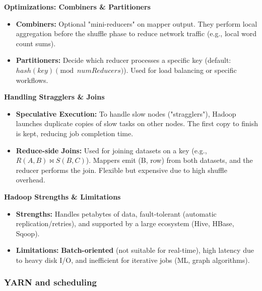 \textbf{Optimizations: Combiners \& Partitioners}
\begin{itemize}
    \item \textbf{Combiners:} Optional "mini-reducers" on mapper output. They perform local aggregation before the shuffle phase to reduce network traffic (e.g., local word count sums).
    \item \textbf{Partitioners:} Decide which reducer processes a specific key (default: $hash(key) \pmod{numReducers}$). Used for load balancing or specific workflows.
\end{itemize}



\textbf{Handling Stragglers \& Joins}
\begin{itemize}
    \item \textbf{Speculative Execution:} To handle slow nodes ("stragglers"), Hadoop launches duplicate copies of slow tasks on other nodes. The first copy to finish is kept, reducing job completion time.
    \item \textbf{Reduce-side Joins:} Used for joining datasets on a key (e.g., $R(A,B) \bowtie S(B,C)$). Mappers emit (B, row) from both datasets, and the reducer performs the join. Flexible but expensive due to high shuffle overhead.
\end{itemize}

\textbf{Hadoop Strengths \& Limitations}
\begin{itemize}
    \item \textbf{Strengths:} Handles petabytes of data, fault-tolerant (automatic replication/retries), and supported by a large ecosystem (Hive, HBase, Sqoop).
    \item \textbf{Limitations:} \textbf{Batch-oriented} (not suitable for real-time), high latency due to heavy disk I/O, and inefficient for iterative jobs (ML, graph algorithms).
\end{itemize}
\subsubsection{YARN and scheduling}

